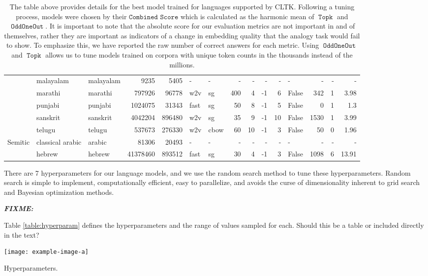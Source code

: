 \documentclass[11pt,a4paper]{article}
\DeclareMathOperator{\OddOneOut}{\texttt{OddOneOut}}
\DeclareMathOperator{\topk}{\texttt{Topk}}
\newcommand{\fixme}[1]{{\color{red}\itshape \textbf{FIXME:} {#1}}}
\begin{document}
\begin{table}[t]
\begin{tabular}{l|llrr|llrrrrl|rrr}
    &malayalam & malayalam& \num{9235} & \num{5405} & - & - & - & - & - & - & - & - & - & - \\
    &marathi & marathi & \num{797926} & \num{96778} & w2v & sg & 400 & 4 & -1 & 6 & False & 342 & 1 & 3.98 \\
    &punjabi & punjabi & \num{1024075} & \num{31343} & fast & sg & 50 & 8 & -1 & 5 & False & 0 & 1 & 1.3 \\
    &sanskrit & sanskrit & \num{4042204} & \num{896480} & w2v & sg & 35 & 9 & -1 & 10 & False & 1530 & 1 & 3.99\\
    &telugu & telugu & \num{537673} & \num{276330} &  w2v & cbow & 60 & 10 & -1 & 3 & False & 50 & 0 & 1.96 \\
    \midrule
    \multirow{2}{*}{Semitic}&classical arabic & arabic& \num{81306} & \num{20493} & - & - & - & - & - & - & - & - & - & - \\
    &hebrew & hebrew & \num{41378460} & \num{893512} & fast & sg & 30 & 4 & -1 & 3 & False & 1098 & 6 & 13.91 \\  
\bottomrule
\end{tabular}
\caption{The table above provides details for the best model trained for languages supported by CLTK.
Following a tuning process, models were chosen by their $\texttt{Combined Score}$
which is calculated as the harmonic mean of $\topk$ and $\OddOneOut$.
It is important to note that the absolute score for our evaluation metrics are not important in and of themselves,
rather they are important as indicators of a change in embedding quality that the analogy task would fail to show.
To emphasize this, we have reported the raw number of correct answers for each metric.
Using $\OddOneOut$ and $\topk$ allows us to tune models trained on corpora with unique token counts in the thousands instead of the millions.}
\label{table:language}
\end{table}

There are 7 hyperparameters for our language models,
and we use the random search method \citep{bergstra2012random} to tune these hyperparameters.
Random search is simple to implement, computationally efficient, easy to parallelize, and avoids the curse of dimensionality inherent to grid search and Bayesian optimization methods.
\fixme{
Table \ref{table:hyperparam} defines the hyperparameters and the range of values sampled for each.
Should this be a table or included directly in the text?
\begin{table}
    \texttt{[image: example-image-a]}
    \caption{Hyperparameters.}
    \label{table:hyperparam}
\end{table}
}
\end{document}

